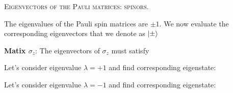 \documentclass{article}
\begin{document}
\textsc{Eigenvectors of the Pauli matrices: spinors}.

The eigenvalues of the Pauli spin matrices are $\pm 1$. We now evaluate the corresponding eigenvectors that we denote as $\ket{\pm}$

\textbf{Matix $\sigma_z$}: The eigenvectors of $\sigma_z$ must satisfy



Let's consider eigenvalue $\lambda = +1$ and find corresponding eigenstate:



Let's consider eigenvalue $\lambda = -1$ and find corresponding eigenstate:
\end{document}
